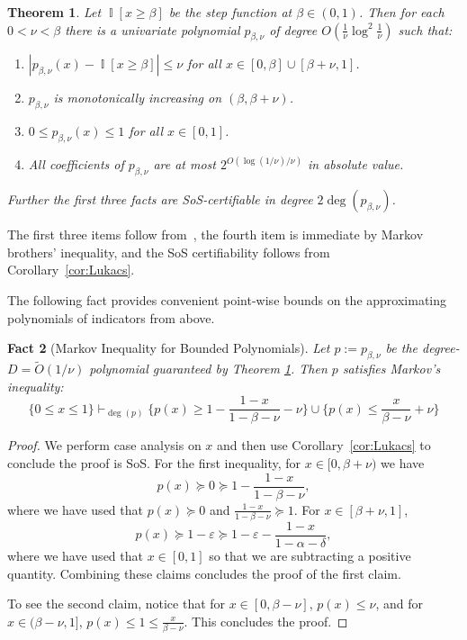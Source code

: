 \documentclass[11pt]{article}
\DeclareMathOperator*{\Ind}{\mathbb{I}}
\def \cA {\mathcal{A}}
\def \tO {\widetilde{O}}
\def \sos {SoS\xspace}
\def \eps {{\varepsilon}}
\newtheorem{theorem}{Theorem}[section]
\newtheorem{fact}[theorem]{Fact}
\theoremstyle{definition}
\begin{document}
\begin{theorem}\label{thm:step-approx}
Let $\Ind[x \geq \beta]$ be the step function at $\beta \in (0,1)$. Then for each $0 < \nu < \beta$ there is a univariate polynomial $p_{\beta,\nu}$ of degree $O(\frac{1}{\nu}\log^2\frac{1}{\nu})$ such that:
\begin{enumerate}
\item $|p_{\beta,\nu}(x) - \Ind[x \geq \beta]| \le \nu$ for all $x \in [0, \beta] \cup [\beta +\nu, 1]$.
\item $p_{\beta,\nu}$ is monotonically increasing on $(\beta, \beta + \nu)$.
\item $0 \le p_{\beta,\nu}(x) \le 1$ for all $x \in [0,1]$.
\item All coefficients of $p_{\beta,\nu}$ are at most
$2^{O(\log(1/\nu)/\nu)}$ in absolute value.
\end{enumerate}
Further the first three facts are SoS-certifiable in degree $2\deg(p_{\beta,\nu})$.
\end{theorem}
The first three items follow from~\cite[Theorem 4.5]{diakonikolas2010bounded}, the fourth 
item is immediate by Markov brothers' inequality, and the SoS certifiability follows from Corollary~\ref{cor:Lukacs}.

The following fact provides convenient point-wise bounds on the approximating polynomials of indicators from above. %
\begin{fact}[Markov Inequality for Bounded Polynomials]
\label{fact:bdd-markov}
Let $p := p_{\beta,\nu}$ be the degree-$D = \tO(1/\nu)$ polynomial guaranteed by Theorem \ref{thm:step-approx}.
Then $p$ satisfies Markov's inequality:
\begin{equation*}
\{0 \le x \le 1\}
\vdash_{\deg(p)} 
\{ p(x) \ge 1 - \frac{1-x}{1-\beta-\nu} - \nu\} \cup \{p(x) \le \frac{x}{\beta-\nu} + \nu\}
\end{equation*}
\end{fact}
\begin{proof}
We perform case analysis on $x$ and then use Corollary~\ref{cor:Lukacs} to conclude the proof
is \sos.
For the first inequality, for $x \in [0,\beta+\nu)$ 
we have
\[
p(x) \succeq 0 \succeq 1 - \frac{1-x}{1-\beta - \nu},
\]
where we have used that $p(x) \succeq 0$ and $\frac{1-x}{1-\beta - \nu}\succeq 1$. For $x \in [\beta +\nu, 1]$,
\[
p(x) \succeq 1 - \eps \succeq 1 - \eps - \frac{1-x}{1-\alpha-\delta},
\]
where we have used that $x \in [0,1]$ so that we are subtracting a positive quantity.
Combining these claims concludes the proof of the first claim.

To see the second claim, notice that for $x \in [0,\beta-\nu]$, $p(x) \le \nu$, and for $x \in (\beta - \nu, 1]$, $p(x) \le 1 \le \frac{x}{\beta - \nu}$.
This concludes the proof.
\end{proof}
\end{document}
